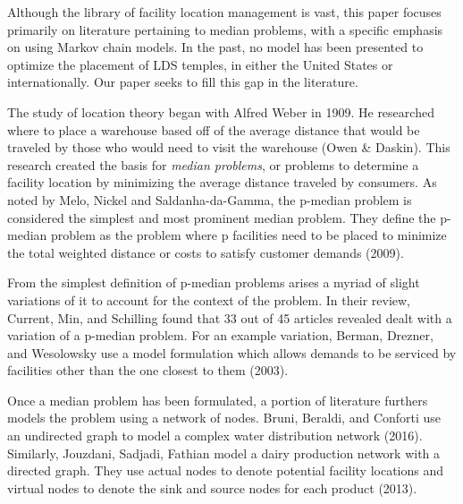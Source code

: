 \documentclass[twoside,twocolumn]{article}
\begin{document}
Although the library of facility location management is vast, this paper focuses primarily on literature pertaining to median problems, with a specific emphasis on using Markov chain models.
In the past, no model has been presented to optimize the placement of LDS temples, in either the United States or internationally.
Our paper seeks to fill this gap in the literature. %

The study of location theory began with Alfred Weber in 1909. 
He researched where to place a warehouse based off of the average distance that would be traveled by those who would need to visit the warehouse (Owen \& Daskin).
This research created the basis for {\em median problems}, or problems to determine a facility location by minimizing the average distance traveled by consumers. %
As noted by Melo, Nickel and Saldanha-da-Gamma, the p-median problem is considered the simplest and most prominent median problem.  %
They define the p-median problem as the problem where p facilities need to be placed to minimize the total weighted distance or costs to satisfy customer demands (2009).

From the simplest definition of p-median problems arises a myriad of slight variations of it to account for the context of the problem. %
In their review, Current, Min, and Schilling found that 33 out of 45 articles revealed dealt with a variation of a p-median problem.
For an example variation, Berman, Drezner, and Wesolowsky use a model formulation which allows demands to be serviced by facilities other than the one closest to them (2003).

Once a median problem has been formulated, a portion of literature furthers models the problem using a network of nodes.
Bruni, Beraldi, and Conforti use an undirected graph to model a complex water distribution network (2016).
Similarly, Jouzdani, Sadjadi, Fathian model a dairy production network with a directed graph.
They use actual nodes to denote potential facility locations and virtual nodes to denote the sink and source nodes for each product (2013).
\end{document}
